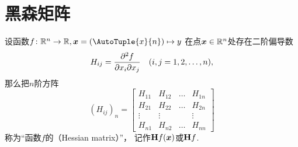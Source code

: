\section{黑森矩阵}
\begin{definition}
设函数\(f\colon\mathbb{R}^n\to\mathbb{R}, \vb{x}=(\AutoTuple{x}{n}) \mapsto y\)
在点\(\boldsymbol{x} \in \mathbb{R}^n\)处存在二阶偏导数\[
	H_{ij} = \pdv[2]{f}{x_i}{x_j}
	\quad(i,j=1,2,\dotsc,n),
\]
那么把\(n\)阶方阵\[
	(H_{ij})_n
	= \begin{bmatrix}
		H_{11} & H_{12} & \dots & H_{1n} \\
		H_{21} & H_{22} & \dots & H_{2n} \\
		\vdots & \vdots & & \vdots \\
		H_{n1} & H_{n2} & \dots & H_{nn}
	\end{bmatrix}
\]称为“函数\(f\)的（Hessian matrix）”，
记作\(\boldsymbol{\operatorname{H}} f(\boldsymbol{x})\)或\(\boldsymbol{\operatorname{H}} f\).
\end{definition}
